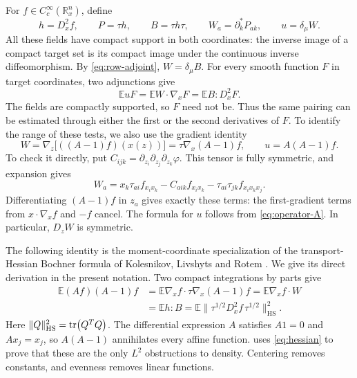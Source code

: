 For $f\in C_c^\infty(\mathbb{R}_x^n)$, define
\begin{equation}\label{eq:test-fields}
 h=D_x^2f,\qquad P=\tau h,\qquad B=\tau h\tau,
 \qquad W_a=\partial_k^*P_{ak},\qquad u=\delta_\mu W.
\end{equation}
All these fields have compact support in both coordinates: the inverse image of a compact target set is its compact image under the continuous inverse diffeomorphism.  By \eqref{eq:row-adjoint}, $W=\delta_\mu B$.  For every smooth function $F$ in target coordinates, two adjunctions give
\begin{equation}\label{eq:test-pairing}
 \mathbb{E}uF=\mathbb{E}W\cdot\nabla_xF=\mathbb{E}B:D_x^2F.
\end{equation}
The fields are compactly supported, so $F$ need not be. Thus the same pairing can be estimated through either the first or the second derivatives of $F$. To identify the range of these tests, we also use the gradient identity
\begin{equation}\label{eq:W-gradient}
 W=\nabla_z\bigl[((A-1)f)(x(z))\bigr]
   =\tau\nabla_x(A-1)f,
 \qquad u=A(A-1)f.
\end{equation}
To check it directly, put $C_{ijk}=\partial_{z_i}\partial_{z_j}\partial_{z_k}\varphi$. This tensor is fully symmetric, and expansion gives
\[
 W_a=x_k\tau_{ai}f_{x_ix_k}
       -C_{aik}f_{x_ix_k}
       -\tau_{ai}\tau_{jk}f_{x_ix_kx_j}.
\]
Differentiating $(A-1)f$ in $z_a$ gives exactly these terms: the first-gradient terms from $x\cdot\nabla_xf$ and $-f$ cancel. The formula for $u$ follows from \eqref{eq:operator-A}. In particular, $D_zW$ is symmetric.

The following identity is the moment-coordinate specialization of the transport-Hessian Bochner formula of Kolesnikov, Livshyts and Rotem \cite[Proposition~4.8]{KLR2026}. We give its direct derivation in the present notation. Two compact integrations by parts give
\begin{equation}\label{eq:hessian}
 \begin{aligned}
 \mathbb{E}(Af)(A-1)f
 &=\mathbb{E}\nabla_x f\cdot\tau\nabla_x(A-1)f
   =\mathbb{E}\nabla_x f\cdot W\\
 &=\mathbb{E}h:B
   =\mathbb{E}\bigl\|\tau^{1/2}D_x^2f\,\tau^{1/2}\bigr\|_{\mathrm{HS}}^2.
 \end{aligned}
\end{equation}
Here $\|Q\|_{\mathrm{HS}}^2=\tr(Q^TQ)$. The differential expression $A$ satisfies $A1=0$ and $Ax_j=x_j$, so $A(A-1)$ annihilates every affine function.  uses \eqref{eq:hessian} to prove that these are the only $L^2$ obstructions to density. Centering removes constants, and evenness removes linear functions.
